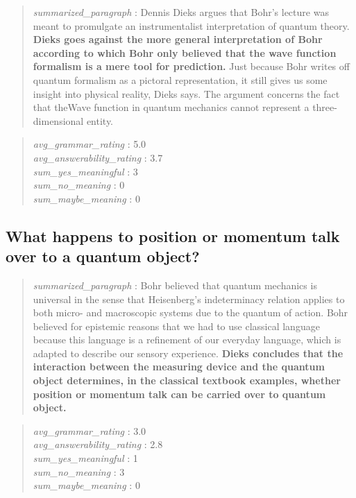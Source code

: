 \begin{quote}
\emph{summarized\_paragraph} : Dennis Dieks argues that Bohr's lecture
was meant to promulgate an instrumentalist interpretation of quantum
theory. \textbf{Dieks goes against the more general interpretation of
Bohr according to which Bohr only believed that the wave function
formalism is a mere tool for prediction.} Just because Bohr writes off
quantum formalism as a pictoral representation, it still gives us some
insight into physical reality, Dieks says. The argument concerns the
fact that theWave function in quantum mechanics cannot represent a
three-dimensional entity.
\end{quote}

\begin{quote}
\emph{avg\_grammar\_rating} : 5.0\\
\emph{avg\_answerability\_rating} : 3.7\\
\emph{sum\_yes\_meaningful} : 3\\
\emph{sum\_no\_meaning} : 0\\
\emph{sum\_maybe\_meaning} : 0
\end{quote}

\hypertarget{what-happens-to-position-or-momentum-talk-over-to-a-quantum-object}{%
\subsection{What happens to position or momentum talk over to a quantum
object?}\label{what-happens-to-position-or-momentum-talk-over-to-a-quantum-object}}

\begin{quote}
\emph{summarized\_paragraph} : Bohr believed that quantum mechanics is
universal in the sense that Heisenberg's indeterminacy relation applies
to both micro- and macroscopic systems due to the quantum of action.
Bohr believed for epistemic reasons that we had to use classical
language because this language is a refinement of our everyday language,
which is adapted to describe our sensory experience. \textbf{Dieks
concludes that the interaction between the measuring device and the
quantum object determines, in the classical textbook examples, whether
position or momentum talk can be carried over to quantum object.}
\end{quote}

\begin{quote}
\emph{avg\_grammar\_rating} : 3.0\\
\emph{avg\_answerability\_rating} : 2.8\\
\emph{sum\_yes\_meaningful} : 1\\
\emph{sum\_no\_meaning} : 3\\
\emph{sum\_maybe\_meaning} : 0
\end{quote}

